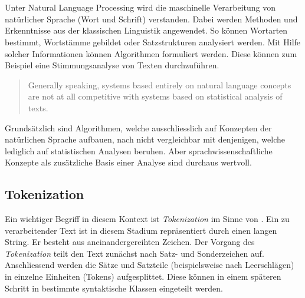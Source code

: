 
\section{}\label{natural-language-processing}


Unter \gls{Natural Language Processing} wird die maschinelle Verarbeitung von natürlicher Sprache (Wort und Schrift) verstanden. Dabei werden Methoden und Erkenntnisse aus der klassischen \gls{Linguistik} angewendet. So können Wortarten bestimmt, Wortstämme gebildet oder Satzstrukturen analysiert werden. Mit Hilfe solcher Informationen können Algorithmen formuliert werden. Diese können zum Beispiel eine Stimmungsanalyse von Texten durchzuführen. 

\begin{quote}
Generally speaking, systems based entirely on natural language concepts are not at all competitive with systems based on statistical analysis of texts.\\\cite{kantor2001foundations}
\end{quote}

Grundsätzlich sind Algorithmen, welche ausschliesslich auf Konzepten der natürlichen Sprache aufbauen, nach \cite{kantor2001foundations} nicht vergleichbar mit denjenigen, welche lediglich auf statistischen Analysen beruhen. Aber sprachwissenschaftliche Konzepte als zusätzliche Basis einer Analyse sind durchaus wertvoll.


\subsection{Tokenization}\label{tokenization}


Ein wichtiger Begriff in diesem Kontext ist \textit{Tokenization} im Sinne von \cite{grefenstette1994word}. Ein zu verarbeitender Text ist in diesem Stadium repräsentiert durch einen langen String. Er besteht aus aneinandergereihten Zeichen. Der Vorgang des \textit{Tokenization} teilt den Text zunächst nach Satz- und Sonderzeichen auf. Anschliessend werden die Sätze und Satzteile (beispielsweise nach Leerschlägen) in einzelne Einheiten (Tokens) aufgesplittet. Diese können in einem späteren Schritt in bestimmte syntaktische Klassen eingeteilt werden.

